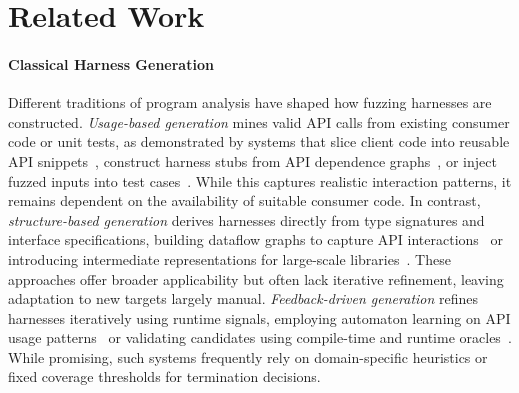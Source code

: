 \section{Related Work}
\label{sec:related-work}

\paragraph{Classical Harness Generation}
Different traditions of program analysis have shaped how fuzzing harnesses are constructed. \textit{Usage-based generation} mines valid API calls from existing consumer code or unit tests, as demonstrated by systems that slice client code into reusable API snippets~\cite{DBLP:conf/sigsoft/BabicBCIKKLSW19:FUDGE}, construct harness stubs from API dependence graphs~\cite{DBLP:conf/uss/IspoglouAMP20:FuzzGen}, or inject fuzzed inputs into test cases~\cite{DBLP:conf/sp/JeongJYMKJKSH23:UTopia}. While this captures realistic interaction patterns, it remains dependent on the availability of suitable consumer code. In contrast, \textit{structure-based generation} derives harnesses directly from type signatures and interface specifications, building dataflow graphs to capture API interactions~\cite{DBLP:conf/icse/GreenA22:GraphFuzz} or introducing intermediate representations for large-scale libraries~\cite{DBLP:journals/pacmse/ToffaliniBTP25:LibErator, DBLP:conf/icse/ShermanN25:OGHarn}. These approaches offer broader applicability but often lack iterative refinement, leaving adaptation to new targets largely manual. \textit{Feedback-driven generation} refines harnesses iteratively using runtime signals, employing automaton learning on API usage patterns~\cite{DBLP:conf/uss/ZhangLZZZZXLL0H23:Rubick} or validating candidates using compile-time and runtime oracles~\cite{DBLP:conf/icse/ShermanN25:OGHarn}. While promising, such systems frequently rely on domain-specific heuristics or fixed coverage thresholds for termination decisions.

